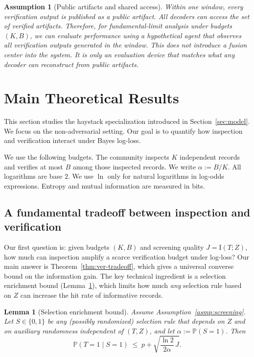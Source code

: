 \documentclass[twocolumn]{scholar7}
\newtheorem{lemma}[theorem]{Lemma}
\newtheorem{assumption}[theorem]{Assumption}
\newcommand{\Prob}{\mathbb{P}}
\newcommand{\I}{\mathrm{I}}
\begin{document}
\begin{assumption}[Public artifacts and shared access]
\label{asmp:public-artifacts}
Within one window, every verification output is published as a public artifact.
All decoders can access the set of verified artifacts.
Therefore, for fundamental-limit analysis under budgets $(K,B)$, we can evaluate performance using a hypothetical agent that observes all verification outputs generated in the window.
This does not introduce a fusion center into the system.
It is only an evaluation device that matches what any decoder can reconstruct from public artifacts.
\end{assumption}

\section{Main Theoretical Results}
\label{sec:theory}

This section studies the haystack specialization introduced in Section~\ref{sec:model}.
We focus on the non-adversarial setting.
Our goal is to quantify how inspection and verification interact under Bayes log-loss.

We use the following budgets.
The community inspects $K$ independent records and verifies at most $B$ among those inspected records.
We write $\alpha:=B/K$.
All logarithms are base $2$.
We use $\ln$ only for natural logarithms in log-odds expressions.
Entropy and mutual information are measured in bits.

\subsection{A fundamental tradeoff between inspection and verification}
\label{subsec:tradeoff}

Our first question is: given budgets $(K,B)$ and screening quality $J=\I(T;Z)$, how much can inspection amplify a scarce verification budget under log-loss?
Our main answer is Theorem~\ref{thm:ver-tradeoff}, which gives a universal converse bound on the information gain.
The key technical ingredient is a selection enrichment bound (Lemma~\ref{lem:enrichment}), which limits how much \emph{any} selection rule based on $Z$ can increase the hit rate of informative records.

\begin{lemma}[Selection enrichment bound]
\label{lem:enrichment}
Assume Assumption~\ref{asmp:screening}.
Let $S\in\{0,1\}$ be any (possibly randomized) selection rule that depends on $Z$ and on auxiliary randomness independent of $(T,Z)$, and let
$\alpha:=\Prob(S=1)$.
Then
\begin{equation}
\label{eq:enrichment}
\Prob(T=1\mid S=1)
\;\le\;
p + \sqrt{\frac{\ln 2}{2\alpha}\,J}.
\end{equation}
\end{lemma}
\end{document}
